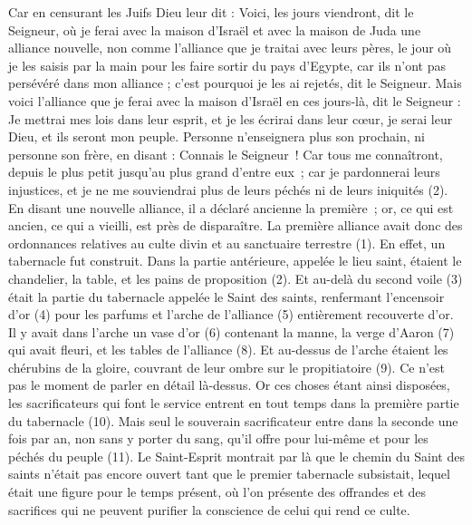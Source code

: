 \begin{multicols}{2}
Car en censurant les Juifs Dieu leur dit : Voici, les jours viendront, dit le Seigneur, où je ferai avec la maison d'Israël et avec la maison de Juda une alliance nouvelle,
non comme l'alliance que je traitai avec leurs pères, le jour où je les saisis par la main pour les faire sortir du pays d'Egypte, car ils n'ont pas persévéré dans mon alliance ; c'est pourquoi je les ai rejetés, dit le Seigneur.
Mais voici l'alliance que je ferai avec la maison d'Israël en ces jours-là, dit le Seigneur : Je mettrai mes lois dans leur esprit, et je les écrirai dans leur cœur, je serai leur Dieu, et ils seront mon peuple.
Personne n'enseignera plus son prochain, ni personne son frère, en disant : Connais le Seigneur ! Car tous me connaîtront, depuis le plus petit jusqu'au plus grand d'entre eux ;
car je pardonnerai leurs injustices, et je ne me souviendrai plus de leurs péchés ni de leurs iniquités (2).
En disant une nouvelle alliance, il a déclaré ancienne la première ; or, ce qui est ancien, ce qui a vieilli, est près de disparaître.
\VerseOne{}La première alliance avait donc des ordonnances relatives au culte divin et au sanctuaire terrestre (1).
En effet, un tabernacle fut construit. Dans la partie antérieure, appelée le lieu saint, étaient le chandelier, la table, et les pains de proposition (2).
Et au-delà du second voile (3) était la partie du tabernacle appelée le Saint des saints,
renfermant l’encensoir d'or (4) pour les parfums et l'arche de l'alliance (5) entièrement recouverte d'or. Il y avait dans l’arche un vase d'or (6) contenant la manne, la verge d'Aaron (7) qui avait fleuri, et les tables de l'alliance (8).
Et au-dessus de l'arche étaient les chérubins de la gloire, couvrant de leur ombre sur le propitiatoire (9). Ce n’est pas le moment de parler en détail là-dessus.
Or ces choses étant ainsi disposées, les sacrificateurs qui font le service entrent en tout temps dans la première partie du tabernacle (10).
Mais seul le souverain sacrificateur entre dans la seconde une fois par an, non sans y porter du sang, qu’il offre pour lui-même et pour les péchés du peuple (11).
Le Saint-Esprit montrait par là que le chemin du Saint des saints n'était pas encore ouvert tant que le premier tabernacle subsistait,
lequel était une figure pour le temps présent, où l’on présente des offrandes et des sacrifices qui ne peuvent purifier la conscience de celui qui rend ce culte.

\end{multicols}

